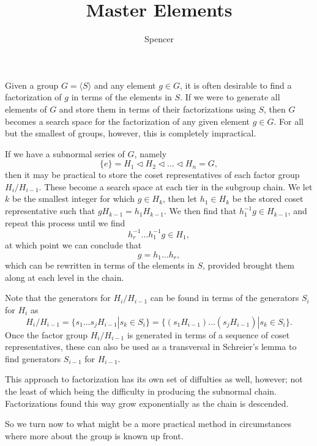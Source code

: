 \documentclass[12pt]{article}
\title{Master Elements}
\author{Spencer}
\begin{document}
\maketitle

Given a group $G=\langle S\rangle$ and any element $g\in G$, it is often desirable to
find a factorization of $g$ in terms of the elements in $S$.
If we were to generate all elements of $G$ and store them in terms of their
factorizations using $S$, then $G$ becomes a search space for the factorization
of any given element $g\in G$.  For all but the smallest of groups, however, this is completely impractical.

If we have a subnormal series of $G$, namely
\begin{equation*}
\{e\}=H_1\triangleleft  H_2\triangleleft\dots\triangleleft H_n=G,
\end{equation*}
then it may be practical to store the coset representatives of each
factor group $H_i/H_{i-1}$.  These become a search space at each tier
in the subgroup chain.  We let $k$ be the smallest integer
for which $g\in H_k$, then let $h_1\in H_k$ be the stored coset representative
such that $gH_{k-1}=h_1H_{k-1}$.  We then find that $h_1^{-1}g\in H_{k-1}$,
and repeat this process until we find
\begin{equation*}
h_r^{-1}\dots h_1^{-1}g\in H_1,
\end{equation*}
at which point we can conclude that
\begin{equation*}
g = h_1\dots h_r,
\end{equation*}
which can be rewritten in terms of the elements in $S$, provided brought them along at
each level in the chain.

Note that the generators for $H_i/H_{i-1}$ can be found in terms of the
generators $S_i$ for $H_i$ as
\begin{equation*}
H_i/H_{i-1} = \{s_1\dots s_jH_{i-1}|s_k\in S_i\} = \{(s_1H_{i-1})\dots(s_jH_{i-1})|s_k\in S_i\}.
\end{equation*}
Once the factor group $H_i/H_{i-1}$ is generated in terms of a sequence of
coset representatives, these can also be used as a transversal in Schreier's lemma
to find generators $S_{i-1}$ for $H_{i-1}$.

This approach to factorization has its own set of diffulties as well, however; not the least of
which being the difficulty in producing the subnormal chain.  Factorizations found this way
grow exponentially as the chain is descended.

So we turn now to what might be
a more practical method in circumstances where more about the group is known up front.
\end{document}
